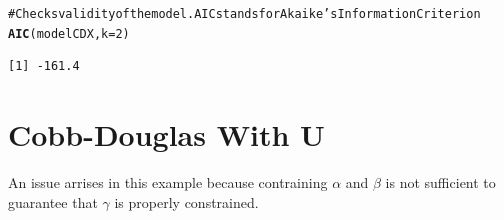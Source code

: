 \documentclass[10pt]{article}\usepackage{graphicx, color}
\makeatletter
\newcommand{\hlfunctioncall}[1]{\textcolor[rgb]{0.501960784313725,0,0.329411764705882}{\textbf{#1}}}%
\newcommand{\hlcomment}[1]{\textcolor[rgb]{0.180392156862745,0.6,0.341176470588235}{#1}}%
\newenvironment{kframe}{%
 \def\at@end@of@kframe{}%
 \ifinner\ifhmode%
  \def\at@end@of@kframe{\end{minipage}}%
  \begin{minipage}{\columnwidth}%
 \fi\fi%
 \def\FrameCommand##1{\hskip\@totalleftmargin \hskip-\fboxsep
 \colorbox{shadecolor}{##1}\hskip-\fboxsep
     \hskip-\linewidth \hskip-\@totalleftmargin \hskip\columnwidth}%
 \MakeFramed {\advance\hsize-\width
   \@totalleftmargin\z@ \linewidth\hsize
   \@setminipage}}%
 {\par\unskip\endMakeFramed%
 \at@end@of@kframe}
\newenvironment{knitrout}{}{} %
\makeatother
\begin{document}
\begin{knitrout}
\begin{kframe}
\begin{alltt}
\hlcomment{# Checks validity of the model. AIC stands for Akaike's Information Criterion}
\hlfunctioncall{AIC}(modelCDX, k=2)
\end{alltt}
\begin{verbatim}
[1] -161.4
\end{verbatim}
\end{kframe}
\end{knitrout}


\section{Cobb-Douglas With U}

An issue arrises in this example because contraining $\alpha$ and $\beta$ is not sufficient to 
guarantee that $\gamma$ is properly constrained.
\end{document}
